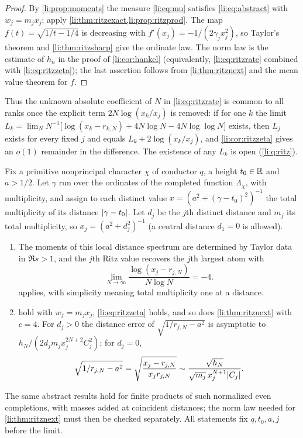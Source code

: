 \begin{proof}
By \cref{li:prop:moments} the measure \eqref{li:eq:mu} satisfies \eqref{li:eq:abstract} with $w_j=m_jx_j$;
apply \cref{li:thm:ritzexact,li:prop:ritzprod}. The map $f(t)=\sqrt{1/t-1/4}$ is decreasing with
$f'(x_j)=-1/(2\gamma_jx_j^2)$, so Taylor's theorem and \cref{li:thm:ritzsharp} give the ordinate law.
The norm law is the estimate of $h_n$ in the proof of \cref{li:cor:hankel} (equivalently,
\eqref{li:eq:ritzrate} combined with \eqref{li:eq:ritzzeta}); the last assertion follows from
\cref{li:thm:ritznext} and the mean value theorem for $f$.
\end{proof}

Thus the unknown absolute coefficient of $N$ in \eqref{li:eq:ritzrate} is common to all ranks once the
explicit term $2N\log(x_k/x_j)$ is removed: if for one $k$ the limit
$L_k=\lim_N N^{-1}\bigl[\log(x_k-r_{k,N})+4N\log N-4N\log\log N\bigr]$ exists, then $L_j$ exists for every
fixed $j$ and equals $L_k+2\log(x_k/x_j)$, and \cref{li:cor:ritzzeta} gives an $o(1)$ remainder in the
difference. The existence of any $L_k$ is open (\cref{li:q:ritz}).

\begin{corollary}\label{li:cor:ritzdirexact}
Fix a primitive nonprincipal character $\chi$ of conductor $q$, a height $t_0\in\mathbb{R}$ and $a>1/2$.
Let $\gamma$ run over the ordinates of the completed function $\Lambda_\chi$, with multiplicity, and
assign to each distinct value $x=(a^2+(\gamma-t_0)^2)^{-1}$ the total multiplicity of its distance
$\lvert\gamma-t_0\rvert$. Let $d_j$ be the $j$th distinct distance and $m_j$ its total multiplicity, so
$x_j=(a^2+d_j^2)^{-1}$ (a central distance $d_1=0$ is allowed).
\begin{enumerate}[label=\textup{(\roman*)}]
\item\label{li:cor:ritzdir} The moments of this local distance spectrum are determined by Taylor
 data in $\Re s>1$, and the $j$th Ritz value recovers the $j$th largest atom with
 \[
  \lim_{N\to\infty}\frac{\log(x_j-r_{j,N})}{N\log N}=-4 .
 \]
  applies, with simplicity meaning total multiplicity one at a distance.
\item
 hold with $w_j=m_jx_j$, \eqref{li:eq:ritzzeta} holds, and so does \cref{li:thm:ritznext} with
 $c=4$. For $d_j>0$ the distance error of $\sqrt{1/r_{j,N}-a^2}$ is asymptotic to
 $h_N/(2d_jm_jx_j^{2N+2}C_j^2)$; for $d_j=0$,
 \[
  \sqrt{1/r_{j,N}-a^2}=\sqrt{\frac{x_j-r_{j,N}}{x_jr_{j,N}}}\sim\frac{\sqrt{h_N}}{\sqrt{m_j}\,x_j^{N+1}\lvert C_j\rvert} .
 \]
\end{enumerate}
The same abstract results hold for finite products of such normalized even completions, with masses
added at coincident distances; the norm law needed for \cref{li:thm:ritznext} must then be checked
separately. All statements fix $q,t_0,a,j$ before the limit.
\end{corollary}

